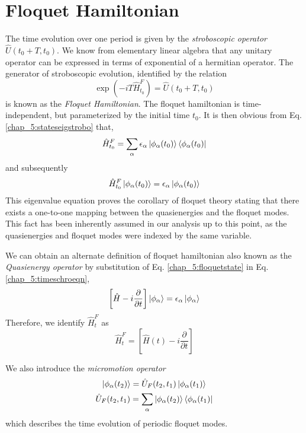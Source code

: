 \section{Floquet Hamiltonian}
The time evolution over one period is given by the \emph{stroboscopic operator} $\hat{U}(t_0 + T, t_0)$. We know from elementary linear algebra that any unitary operator can
be expressed in terms of exponential of a hermitian operator. The generator of stroboscopic evolution, identified by the relation
\begin{equation}
 \exp\left(-iT\hat{H}_{t_0}^{F}\right) = \hat{U}(t_0 + T, t_0)
\end{equation} is known as the \emph{Floquet Hamiltonian}. The floquet hamiltonian is time-independent, but parameterized by the initial time $t_0$.
It is then obvious from Eq. \eqref{chap_5:stateseigstrobo} that,
\begin{equation*}
 \hat{H}_{t_0}^{F} = \sum_{\alpha}{\epsilon_\alpha \ket{\phi_\alpha (t_0)}\bra{\phi_\alpha (t_0)}}
\end{equation*} and subsequently 
\begin{equation}
 \hat{H}_{t_0}^{F}\ket{\phi_\alpha (t_0)} = \epsilon_\alpha \ket{\phi_\alpha (t_0)}
\end{equation} This eigenvalue equation proves the corollary of floquet theory stating that there exists a one-to-one mapping between the quasienergies and the floquet modes. 
This fact has been inherently assumed in our analysis up to this point, as the quasienergies and floquet modes were indexed by the same variable.

We can obtain an alternate definition of floquet hamiltonian also known as the \emph{Quasienergy operator} by substitution of Eq. \eqref{chap_5:floquetstate} in 
Eq. \eqref{chap_5:timeschroeqn},
\begin{equation}
  \left[\hat{H} - i\frac{\partial}{\partial t}\right]\ket{\phi_\alpha} = \epsilon_\alpha\ket{\phi_\alpha}
\end{equation} Therefore, we identify $\hat{H}_{t}^{F}$ as 
\begin{equation}
 \hat{H}_{t}^{F} = \left[\hat{H}(t) - i\frac{\partial}{\partial t}\right]
\end{equation}



We also introduce the \emph{micromotion operator} 
\begin{gather}
  \ket{\phi_\alpha (t_2)} = \hat{U}_{F}(t_2, t_1)\ket{\phi_\alpha (t_1)}\\
  \hat{U}_{F}(t_2, t_1) = \sum_{\alpha}{\ket{\phi_\alpha (t_2)}\bra{\phi_\alpha (t_1)}}
\end{gather} which describes the time evolution of periodic floquet modes.

